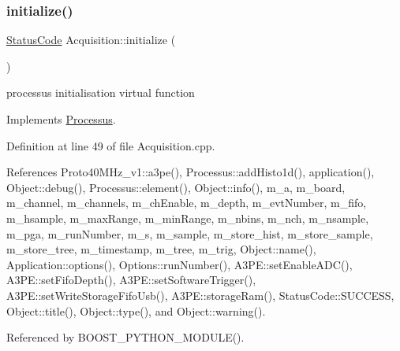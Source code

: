 \subsubsection{\texorpdfstring{initialize()}{initialize()}}
{\footnotesize\ttfamily \hyperlink{classStatusCode}{Status\+Code} Acquisition\+::initialize (\begin{DoxyParamCaption}{ }\end{DoxyParamCaption})\hspace{0.3cm}{\ttfamily [virtual]}}

processus initialisation virtual function 

Implements \hyperlink{classProcessus_aee88ad7b77ae7319cf8b128e9dd2ea11}{Processus}.



Definition at line 49 of file Acquisition.\+cpp.



References Proto40\+M\+Hz\+\_\+v1\+::a3pe(), Processus\+::add\+Histo1d(), application(), Object\+::debug(), Processus\+::element(), Object\+::info(), m\+\_\+a, m\+\_\+board, m\+\_\+channel, m\+\_\+channels, m\+\_\+ch\+Enable, m\+\_\+depth, m\+\_\+evt\+Number, m\+\_\+fifo, m\+\_\+hsample, m\+\_\+max\+Range, m\+\_\+min\+Range, m\+\_\+nbins, m\+\_\+nch, m\+\_\+nsample, m\+\_\+pga, m\+\_\+run\+Number, m\+\_\+s, m\+\_\+sample, m\+\_\+store\+\_\+hist, m\+\_\+store\+\_\+sample, m\+\_\+store\+\_\+tree, m\+\_\+timestamp, m\+\_\+tree, m\+\_\+trig, Object\+::name(), Application\+::options(), Options\+::run\+Number(), A3\+P\+E\+::set\+Enable\+A\+D\+C(), A3\+P\+E\+::set\+Fifo\+Depth(), A3\+P\+E\+::set\+Software\+Trigger(), A3\+P\+E\+::set\+Write\+Storage\+Fifo\+Usb(), A3\+P\+E\+::storage\+Ram(), Status\+Code\+::\+S\+U\+C\+C\+E\+SS, Object\+::title(), Object\+::type(), and Object\+::warning().



Referenced by B\+O\+O\+S\+T\+\_\+\+P\+Y\+T\+H\+O\+N\+\_\+\+M\+O\+D\+U\+L\+E().


